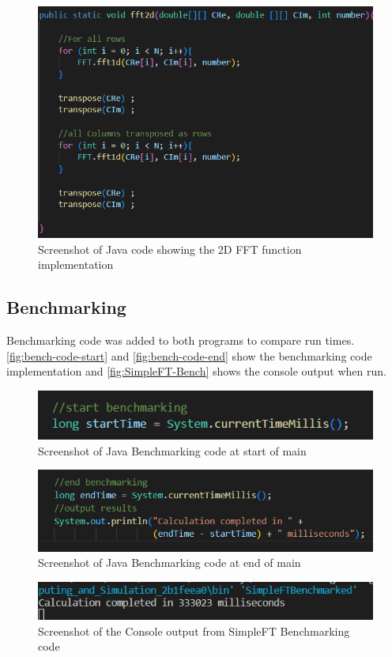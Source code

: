     \begin{figure}[H] 
        \centering
        \includegraphics[width=0.8\columnwidth]{Figures/Week 2/2dFFT Implementation.png}
        \caption{Screenshot of Java code showing the 2D FFT function implementation}
        \label{fig:2dFFT-code}
    \end{figure}

\subsection{Benchmarking}


Benchmarking code was added to both programs to compare run times. \autoref{fig:bench-code-start} and \autoref{fig:bench-code-end} show the benchmarking code implementation and \autoref{fig:SimpleFT-Bench} shows the console output when run.


    \begin{figure}[H] 
        \centering
        \includegraphics[width=0.8\columnwidth]{Figures/Week 2/Bench code Start.png}
        \caption{Screenshot of Java Benchmarking code at start of main}
        \label{fig:bench-code-start}
    \end{figure}
    \begin{figure}[H] 
        \centering
        \includegraphics[width=0.8\columnwidth]{Figures/Week 2/Bench code end.png}
        \caption{Screenshot of Java Benchmarking code at end of main}
        \label{fig:bench-code-end}
    \end{figure}
    \begin{figure}[H] 
        \centering
        \includegraphics[width=0.8\columnwidth]{Figures/Week 2/SimpleFT Bench.png}
        \caption{Screenshot of the Console output from SimpleFT Benchmarking code}
        \label{fig:SimpleFT-Bench}
    \end{figure}

